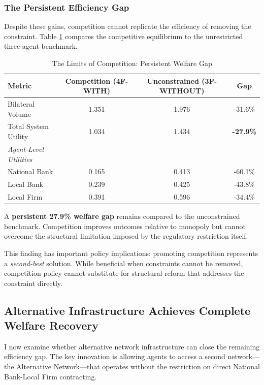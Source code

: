\documentclass[12pt]{article}
\begin{document}
\subsubsection{The Persistent Efficiency Gap}

Despite these gains, competition cannot replicate the efficiency of removing the constraint. Table \ref{tab:competition_vs_unconstrained} compares the competitive equilibrium to the unrestricted three-agent benchmark.

\begin{table}[h]
\centering
\caption{The Limits of Competition: Persistent Welfare Gap}
\label{tab:competition_vs_unconstrained}
\begin{tabular}{lccc}
\toprule
\textbf{Metric} & \textbf{Competition (4F-WITH)} & \textbf{Unconstrained (3F-WITHOUT)} & \textbf{Gap} \\
\midrule
Bilateral Volume & 1.351 & 1.976 & -31.6\% \\
Total System Utility & 1.034 & 1.434 & \textbf{-27.9\%} \\
\midrule
\textit{Agent-Level Utilities} & & & \\
\quad National Bank & 0.165 & 0.413 & -60.1\% \\
\quad Local Bank & 0.239 & 0.425 & -43.8\% \\
\quad Local Firm & 0.391 & 0.596 & -34.4\% \\
\bottomrule
\end{tabular}
\end{table}

A \textbf{persistent 27.9\% welfare gap} remains compared to the unconstrained benchmark. Competition improves outcomes relative to monopoly but cannot overcome the structural limitation imposed by the regulatory restriction itself.

This finding has important policy implications: promoting competition represents a \textit{second-best} solution. While beneficial when constraints cannot be removed, competition policy cannot substitute for structural reform that addresses the constraint directly.

\subsection{Alternative Infrastructure Achieves Complete Welfare Recovery}
\label{sec:dual_network_results}

I now examine whether alternative network infrastructure can close the remaining efficiency gap. The key innovation is allowing agents to access a second network---the Alternative Network---that operates without the restriction on direct National Bank-Local Firm contracting.
\end{document}
